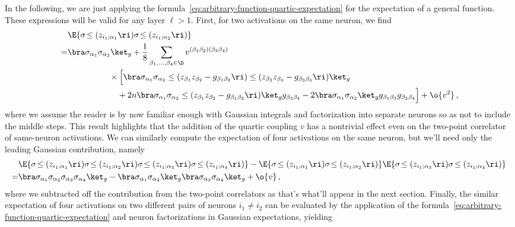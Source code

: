 In the following, we are just applying the formula~\eqref{eq:arbitrary-function-quartic-expectation} for the expectation of a general function.
These expressions will be valid for any layer $\ell > 1$.
First, for two activations on the same neuron, we find %
\begin{align}\label{eq:two-activations-deep}
&\E{\sigma\!\le(z_{i_1;\alpha_1}\ri)\sigma\!\le(z_{i_1;\alpha_2}\ri)}\, \\
=&\bra \sigma_{\alpha_1}\sigma_{\alpha_2}\ket_{g}+\frac{1}{8}\sum_{\beta_1,\ldots,\beta_4\in\D}v^{(\beta_1\beta_2)(\beta_3\beta_4)}\, \nonumber\\
&\quad \quad \quad \quad \quad \times\Big[\bra \sigma_{\alpha_1}\sigma_{\alpha_2} \le(z_{\beta_1} z_{\beta_2}-g_{\beta_1\beta_2}\ri)\le(z_{\beta_3} z_{\beta_4}-g_{\beta_3\beta_4}\ri)\ket_{g}\, \nonumber\\
&\quad \quad \quad \quad \quad \quad +2n \bra \sigma_{\alpha_1}\sigma_{\alpha_2} \le(z_{\beta_1} z_{\beta_2}-g_{\beta_1\beta_2}\ri)\ket_{g} g_{\beta_3\beta_4}-2\bra \sigma_{\alpha_1}\sigma_{\alpha_2}\ket_{g}g_{\beta_1\beta_3}g_{\beta_2\beta_4}\Big]+\o{v^2}\, , \nonumber
\end{align}
where we assume the reader is by now familiar enough with Gaussian integrals and factorization into separate neurons so as not to include the middle steps. This result
highlights that the addition of the quartic coupling $v$ has a nontrivial effect even on the two-point correlator of same-neuron activations. 
We can similarly compute the expectation of four activations on the same neuron, but we'll need only the leading Gaussian contribution, namely
\begin{align}\label{eq:four-activations-same-deep}
&\E{\sigma\!\le(z_{i_1;\alpha_1}\ri)\sigma\!\le(z_{i_1;\alpha_2}\ri)\sigma\!\le(z_{i_1;\alpha_3}\ri)\sigma\!\le(z_{i_1;\alpha_4}\ri)}-\E{\sigma\!\le(z_{i_1;\alpha_1}\ri)\sigma\!\le(z_{i_1;\alpha_2}\ri)}\E{\sigma\!\le(z_{i_1;\alpha_3}\ri)\sigma\!\le(z_{i_1;\alpha_4}\ri)}\, \\
=&\bra \sigma_{\alpha_1}\sigma_{\alpha_2}\sigma_{\alpha_3}\sigma_{\alpha_4}\ket_{g}-\bra \sigma_{\alpha_1}\sigma_{\alpha_2}\ket_{g}\bra\sigma_{\alpha_3}\sigma_{\alpha_4}\ket_{g}+\o{v}\, ,\nonumber
\end{align}
where we subtracted off the contribution from the two-point correlators as that's what'll appear in the next section.
Finally, the similar expectation of four activations on two different pairs of neurons $i_1 \neq i_2$ can be evaluated by the application of the formula~\eqref{eq:arbitrary-function-quartic-expectation} and neuron factorizations in Gaussian expectations, yielding 
